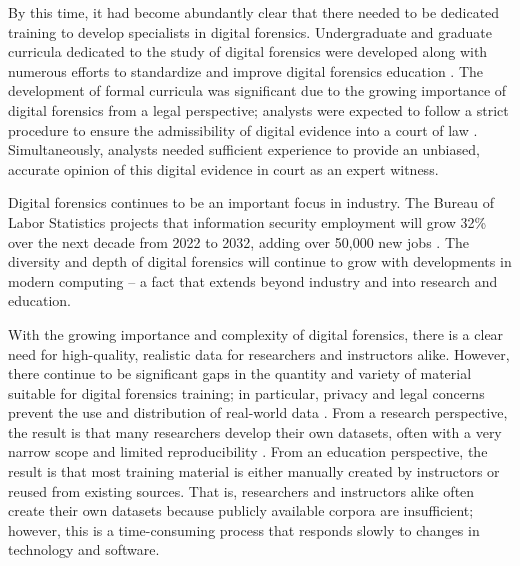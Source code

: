 \documentclass[letterpaper,12pt]{report}
\begin{document}
By this time, it had become abundantly clear that there needed to be
dedicated training to develop specialists in digital forensics.
Undergraduate and graduate curricula dedicated to the study of digital
forensics were developed
\cite{andersonComparativeStudyTeaching2006,srinivasanDigitalForensicsCurriculum2013}
along with numerous efforts to standardize and improve digital forensics
education
\cite{cooperStandardsDigitalForensics2010,nanceDigitalForensicsDefining2009,nanceDigitalForensicsDefining2010,dafoulasOverviewDigitalForensics2019,lucianoDigitalForensicsNext2018}.
The development of formal curricula was significant due to the growing
importance of digital forensics from a legal perspective; analysts were
expected to follow a strict procedure to ensure the admissibility of
digital evidence into a court of law
\cite{conklinComputerForensics2022}. Simultaneously, analysts needed
sufficient experience to provide an unbiased, accurate opinion of this
digital evidence in court as an expert witness.

Digital forensics continues to be an important focus in industry. The
Bureau of Labor Statistics projects that information security employment
will grow 32\% over the next decade from 2022 to 2032, adding over
50,000 new jobs
\cite{bureauoflaborstatisticsu.s.departmentoflaborInformationSecurityAnalysts2023}.
The diversity and depth of digital forensics will continue to grow with
developments in modern computing -- a fact that extends beyond industry
and into research and education.

With the growing importance and complexity of digital forensics, there
is a clear need for high-quality, realistic data for researchers and
instructors alike. However, there continue to be significant gaps in the
quantity and variety of material suitable for digital forensics
training; in particular, privacy and legal concerns prevent the use and
distribution of real-world data
\cite{garfinkelForensicCorporaChallenge2007}. From a research
perspective, the result is that many researchers develop their own
datasets, often with a very narrow scope and limited reproducibility
\cite{garfinkelBringingScienceDigital2009,grajedaAvailabilityDatasetsDigital2017}.
From an education perspective, the result is that most training material
is either manually created by instructors or reused from existing
sources. That is, researchers and instructors alike often create their
own datasets because publicly available corpora are insufficient;
however, this is a time-consuming process that responds slowly to
changes in technology and software.
\end{document}
